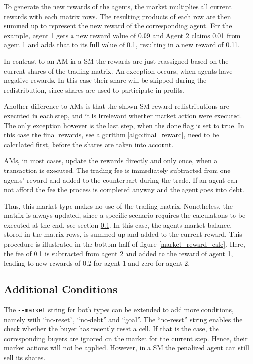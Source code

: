 To generate the new rewards of the agents, the market multiplies all current rewards with each matrix rows. The resulting products of each row are then summed up to represent the new reward of the corresponding agent. For the example, agent 1 gets a new reward value of 0.09 and Agent 2 claims 0.01 from agent 1 and adds that to its full value of 0.1, resulting in a new reward of 0.11. 

In contrast to an AM in a SM the rewards are just reassigned based on the current shares of the trading matrix. An exception occurs, when agents have negative rewards. In this case their share will be skipped during the redistribution, since shares are used to participate in profits. 

Another difference to AMs is that the shown SM reward redistributions are executed in each step, and it is irrelevant whether market action were executed. The only exception however is the last step, when the done flag is set to true. In this case the final rewards, see algorithm \ref{algo:final_reward}, need to be calculated first, before the shares are taken into account.

AMs, in most cases, update the rewards directly and only once, when a transaction is executed. The trading fee is immediately subtracted from one agents' reward and added to the counterpart during the trade. If an agent can not afford the fee the process is completed anyway and the agent goes into debt. 

Thus, this market type makes no use of the trading matrix. Nonetheless, the matrix is always updated, since a specific scenario requires the calculations to be executed at the end, see section \ref{market_conditions}. In this case, the agents market balance, stored in the matrix rows, is summed up and added to the current reward. This procedure is illustrated in the bottom half of figure \ref{market_reward_calc}. Here, the fee of 0.1 is subtracted from agent 2 and added to the reward of agent 1, leading to new rewards of 0.2 for agent 1 and zero for agent 2.

\subsection{Additional Conditions}\label{market_conditions}
The \verb|--market| string for both types can be extended to add more conditions, namely with ``no-reset'', ``no-debt'' and ``goal''. The ``no-reset'' string enables the check whether the buyer has recently reset a cell. If that is the case, the corresponding buyers are ignored on the market for the current step. Hence, their market actions will not be applied. However, in a SM the penalized agent can still sell its shares. 

